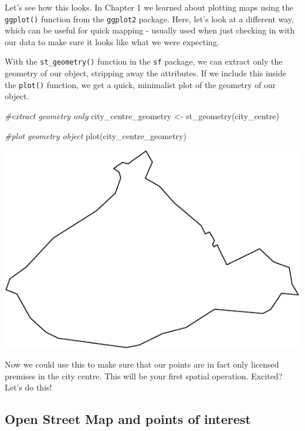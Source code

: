 \documentclass[
  krantz2]{krantz}
\makeatletter
\newenvironment{Shaded}{\begin{snugshade}}{\end{snugshade}}
\newcommand{\CommentTok}[1]{\textcolor[rgb]{0.37,0.37,0.37}{\textit{#1}}}
\newcommand{\FunctionTok}[1]{\textcolor[rgb]{0,0,0}{#1}}
\newcommand{\NormalTok}[1]{#1}
\newcommand{\OtherTok}[1]{\textcolor[rgb]{0.37,0.37,0.37}{#1}}
\newenvironment{kframe}{%
\medskip{}
\setlength{\fboxsep}{.8em}
 \def\at@end@of@kframe{}%
 \ifinner\ifhmode%
  \def\at@end@of@kframe{\end{minipage}}%
  \begin{minipage}{\columnwidth}%
 \fi\fi%
 \def\FrameCommand##1{\hskip\@totalleftmargin \hskip-\fboxsep
 \colorbox{shadecolor}{##1}\hskip-\fboxsep
     \hskip-\linewidth \hskip-\@totalleftmargin \hskip\columnwidth}%
 \MakeFramed {\advance\hsize-\width
   \@totalleftmargin\z@ \linewidth\hsize
   \@setminipage}}%
 {\par\unskip\endMakeFramed%
 \at@end@of@kframe}
\renewenvironment{Shaded}{\begin{kframe}}{\end{kframe}}
\makeatother
\begin{document}
Let's see how this looks. In Chapter 1 we learned about plotting maps using the \texttt{ggplot()} function from the \texttt{ggplot2} package. Here, let's look at a different way, which can be useful for quick mapping - usually used when just checking in with our data to make sure it looks like what we were expecting.

With the \texttt{st\_geometry()} function in the \texttt{sf} package, we can extract only the geometry of our object, stripping away the attributes. If we include this inside the \texttt{plot()} function, we get a quick, minimalist plot of the geometry of our object.

\begin{Shaded}
\begin{Highlighting}[]
\CommentTok{\#extract geometry only}
\NormalTok{city\_centre\_geometry }\OtherTok{\textless{}{-}} \FunctionTok{st\_geometry}\NormalTok{(city\_centre)}

\CommentTok{\#plot geometry object}
\FunctionTok{plot}\NormalTok{(city\_centre\_geometry)}
\end{Highlighting}
\end{Shaded}

\includegraphics{crime_mapping_files/figure-latex/plot_2b-1.pdf}

Now we could use this to make sure that our points are in fact only licensed premises in the city centre. This will be your first spatial operation. Excited? Let's do this!

\hypertarget{open-street-map-and-points-of-interest}{%
\subsection{Open Street Map and points of interest}\label{open-street-map-and-points-of-interest}}
\end{document}
